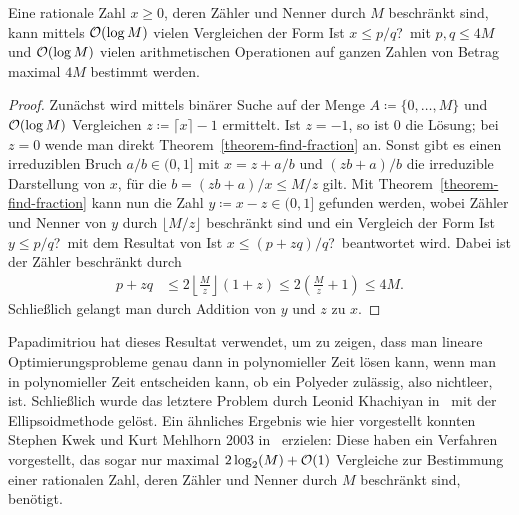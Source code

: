 \begin{theorem}\label{theorem-find-rational}
	Eine rationale Zahl $x\geq0$, deren Zähler und Nenner durch $M$ beschränkt sind, kann mittels $\mathcal{O}(\log M)$ vielen Vergleichen der Form \glqq Ist $x\leq p/q$?\grqq\ mit $p,q\leq 4M$ und $\mathcal{O}(\log M)$ vielen arithmetischen Operationen auf ganzen Zahlen von Betrag maximal $4M$ bestimmt werden.
\end{theorem}
\begin{proof}
	\newcommand{\highx}{\lceil x \rceil}
	Zunächst wird mittels binärer Suche auf der Menge $A\coloneq \{0,\dots, M\}$ und $\mathcal{O}(\log M)$ Vergleichen $z\coloneq \highx - 1$ ermittelt.
	Ist $z=-1$, so ist $0$ die Lösung; bei $z=0$ wende man direkt Theorem~\ref{theorem-find-fraction} an.
	Sonst gibt es einen irreduziblen Bruch $a/b\in(0,1]$ mit $x=z + a/b$ und $(z b + a)/b$ die irreduzible Darstellung von $x$, für die $b = (z b + a)/x \leq M/z$ gilt.
	Mit Theorem~\ref{theorem-find-fraction} kann nun die Zahl $y\coloneq x-z\in(0,1]$ gefunden werden, wobei Zähler und Nenner von $y$ durch $\lfloor M/z \rfloor$ beschränkt sind und ein Vergleich der Form \glqq Ist $y\leq p/q$?\grqq\ mit dem Resultat von \glqq Ist $x\leq (p + zq)/q$?\grqq\ beantwortet wird.
	Dabei ist der Zähler beschränkt durch \begin{align*}
	p+z q &\leq 2 \left\lfloor \frac{M}{z} \right\rfloor (1+z) \leq 2 \left(\frac{M}{z} + 1\right)\leq 4M.
	\end{align*}
	Schließlich gelangt man durch Addition von $y$ und $z$ zu $x$.
\end{proof}

Papadimitriou hat dieses Resultat verwendet, um zu zeigen, dass man lineare Optimierungsprobleme genau dann in polynomieller Zeit lösen kann, wenn man in polynomieller Zeit entscheiden kann, ob ein Polyeder zulässig, also nichtleer, ist.
Schließlich wurde das letztere Problem durch Leonid Khachiyan in~\cite{Kha79} mit der Ellipsoidmethode gelöst.
Ein ähnliches Ergebnis wie hier vorgestellt konnten Stephen Kwek und Kurt Mehlhorn 2003 in~\cite{Kwek:2003} erzielen:
Diese haben ein Verfahren vorgestellt, das sogar nur maximal $2\log_2(M) + \mathcal{O}(1)$ Vergleiche zur Bestimmung einer rationalen Zahl, deren Zähler und Nenner durch $M$ beschränkt sind, benötigt.